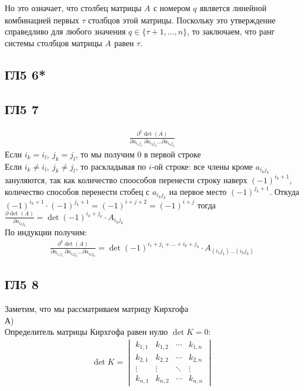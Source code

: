 		Но это означает, что столбец матрицы $A_{}$ с номером $q_{}$ является линейной комбинацией первых $\tau$ столбцов этой матрицы. Поскольку это утверждение справедливо для любого значения $q \in \{ \tau +1,\dots, n \}$, то заключаем, что ранг системы столбцов матрицы $A_{}$ равен $\tau$.
		
		\subsection{ГЛ5 6*}
		
		\subsection{ГЛ5 7}
		\begin{gather*}
			\frac{\partial^{k} \det(A)}{\partial a_{i_{1} j_{1}}\: \partial a_{i_{2} j_{2}} \ldots \partial a_{i_{k} j_{k}}}
		\end{gather*}
		Если $i_k = i_l,\ j_k = j_l$, то мы получим $0$ в первой строке\\
		Если $i_k \ne i_l,\ j_k \ne j_l$, то раскладывая по $i$-ой строке: все члены кроме $a_{i_{k} j_{k}}$ зануляются, так как количество споособов перенести строку наверх $(-1)^{i_k + 1}$, количество способов перенести стобец с $a_{i_{k} j_{k}}$ на первое место $(-1)^{j_k + 1}$. Откуда $(-1)^{i_k + 1} \cdot (-1)^{j_k + 1} = (-1)^{i+j+2} = (-1)^{i+j}$ тогда $\frac{\partial \det(A)}{\partial a_{i_{k} j_{k}}} = \det (-1)^{i_k + j_k} \cdot A_{i_{k} j_{k}}$\\
		По индукции получим:\\
		\begin{gather*}
			\frac{\partial^{k} \det(A)}{\partial a_{i_{1} j_{1}}\: \partial a_{i_{2} j_{2}} \ldots \partial a_{i_{k} j_{k}}} = \det(-1)^{i_1 + j_1 + \ldots + i_k + j_k} \cdot A_{(i_1 j_1 ) \ldots (i_k j_k )}
		\end{gather*}	
		
		\subsection{ГЛ5 8}
		Заметим, что мы рассматриваем матрицу Кирхгофа\\
		А)\\
		Определитель матрицы Кирхгофа равен нулю $\det K=0$:
		\begin{gather*}
			\det K = 
			\begin{vmatrix}
				k_{1, 1} & k_{1, 2} & \cdots & k_{1, n} \\
				k_{2, 1} & k_{2, 2} & \cdots & k_{2, n} \\        
				\vdots & \vdots & \ddots & \vdots \\
				k_{n, 1} & k_{n, 2} & \cdots & k_{n, n}
			\end{vmatrix}
		\end{gather*}
		
